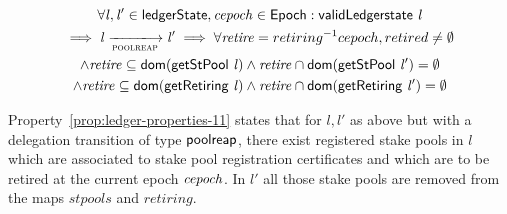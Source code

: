\begin{property}
  \begin{multline*}
    \forall \var{l}, \var{l'} \in \ledgerState, \var{cepoch} \in \Epoch:
    \applyFun{validLedgerstate}{l} \\
    \implies \var{l} \trans{poolreap}{} \var{l'} \implies \forall \var{retire} =
    retiring^{-1} cepoch, retired \neq \emptyset \\ \wedge \var{retire}
    \subseteq \fun{dom}(\applyFun{getStPool}{l}) \wedge
    \var{retire} \cap \fun{dom}(\applyFun{getStPool}{l'}) = \emptyset \\
    \wedge \var{retire} \subseteq \fun{dom}(\applyFun{getRetiring}{l}) \wedge
    \var{retire} \cap \fun{dom}(\applyFun{getRetiring}{l'}) = \emptyset
  \end{multline*}
  \label{prop:ledger-properties-11}
\end{property}

Property~\ref{prop:ledger-properties-11} states that for $l, l'$ as above but
with a delegation transition of type $\mathsf{poolreap}$, there exist registered stake
pools in $l$ which are associated to stake pool registration certificates and
which are to be retired at the current epoch $\mathit{cepoch}$. In $l'$ all those
stake pools are removed from the maps $stpools$ and $retiring$.

